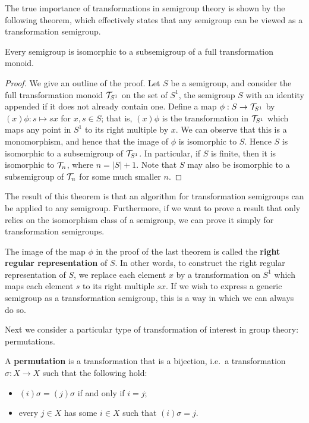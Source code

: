 The true importance of transformations in semigroup theory is shown by the
following theorem, which effectively states that any semigroup can be viewed as
a transformation semigroup.

\begin{theorem}
  \label{thm:cayley-semigroups}
  Every semigroup is isomorphic to a subsemigroup of a full transformation
  monoid.
  \begin{proof}
    We give an outline of the proof.  Let $S$ be a semigroup, and consider the
    full transformation monoid $\mathcal{T}_{S^1}$ on the set of $S^1$, the semigroup $S$
    with an identity appended if it does not already contain one.  Define a map
    $\phi: S \to \mathcal{T}_{S^1}$ by $(x)\phi: s \mapsto sx$ for $x,s \in S$; that is,
    $(x)\phi$ is the transformation in $\mathcal{T}_{S^1}$ which maps any point in
    ${S^1}$ to its right multiple by $x$.  We can observe that this is a
    monomorphism, and hence that the image of $\phi$ is isomorphic to $S$.
    Hence $S$ is isomorphic to a subsemigroup of $\mathcal{T}_{S^1}$.  In particular, if
    $S$ is finite, then it is isomorphic to $\mathcal{T}_n$, where $n = |S|+1$.  Note
    that $S$ may also be isomorphic to a subsemigroup of $\mathcal{T}_n$ for some much
    smaller $n$.
  \end{proof}
\end{theorem}

The result of this theorem is that an algorithm for transformation semigroups
can be applied to any semigroup.  Furthermore, if we want to prove a result that
only relies on the isomorphism class of a semigroup, we can prove it simply for
transformation semigroups.

The image of the map $\phi$ in the proof of the last theorem is called the
\textbf{right regular representation} of $S$.  In other words, to construct the
right regular representation of $S$, we replace each element $x$ by a
transformation on $S^1$ which maps each element $s$ to its right multiple $sx$.
If we wish to express a generic semigroup as a transformation semigroup, this is
a way in which we can always do so.

Next we consider a particular type of transformation of interest in group
theory: permutations.

\begin{definition}
  \label{def:permutation}
  A \textbf{permutation} is a transformation that is a bijection, i.e.~a
  transformation $\sigma: X \to X$ such that the following hold:
  \begin{itemize}
  \item $(i)\sigma=(j)\sigma$ if and only if $i=j$;
  \item every $j \in X$ has some $i \in X$ such that $(i)\sigma = j$.
  \end{itemize}
\end{definition}

